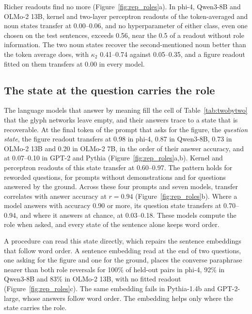 Richer readouts find no more (Figure~\ref{fig:rep_roles}a). In phi-4, Qwen3-8B and OLMo-2 13B, kernel and two-layer perceptron readouts of the token-averaged and noun states transfer at 0.00--0.06, and no hyperparameter of either class, even one chosen on the test sentences, exceeds 0.56, near the 0.5 of a readout without role information. The two noun states recover the second-mentioned noun better than the token average does, with $\kappa_2$ 0.41--0.74 against 0.05--0.35, and a figure readout fitted on them transfers at 0.00 in every model.

\subsection{The state at the question carries the role}
\label{sec:behavior}

The language models that answer by meaning fill the cell of Table~\ref{tab:twobytwo} that the glyph networks leave empty, and their answers trace to a state that is recoverable. At the final token of the prompt that asks for the figure, the \emph{question state}, the figure readout transfers at 0.98 in phi-4, 0.87 in Qwen3-8B, 0.73 in OLMo-2 13B and 0.20 in OLMo-2 7B, in the order of their answer accuracy, and at 0.07--0.10 in GPT-2 and Pythia (Figure~\ref{fig:rep_roles}a,b). Kernel and perceptron readouts of this state transfer at 0.60--0.97. The pattern holds for reworded questions, for prompts without demonstrations and for questions answered by the ground. Across these four prompts and seven models, transfer correlates with answer accuracy at $r = 0.94$ (Figure~\ref{fig:rep_roles}b). Where a model answers with accuracy 0.90 or more, its question state transfers at 0.70--0.94, and where it answers at chance, at 0.03--0.18. These models compute the role when asked, and every state of the sentence alone keeps word order.

A procedure can read this state directly, which repairs the sentence embeddings that follow word order. A sentence embedding read at the end of two questions, one asking for the figure and one for the ground, places the converse paraphrase nearer than both role reversals for 100\% of held-out pairs in phi-4, 92\% in Qwen3-8B and 83\% in OLMo-2 13B, with no fitted readout (Figure~\ref{fig:rep_roles}c). The same embedding fails in Pythia-1.4b and GPT-2-large, whose answers follow word order. The embedding helps only where the state carries the role.

